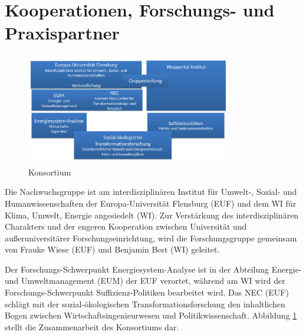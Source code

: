 \documentclass[a4paper,11pt,twoside]{scrartcl}
\begin{document}
\section{Kooperationen, Forschungs- und Praxispartner}
\label{sec:5}

\begin{figure}[!h]
    \centering
    \includegraphics[width=0.8\textwidth]{figures/Konsortium5.pdf}
    \caption{Konsortium}
    \label{fig:konsortium}
\end{figure}

Die Nachwuchsgruppe ist am interdisziplinären Institut für Umwelt-, Sozial- und Humanwissenschaften der Europa-Universität Flensburg (EUF) und dem WI für Klima, Umwelt, Energie angesiedelt (WI).
Zur Verstärkung des interdisziplinären Charakters und der engeren Kooperation zwischen Universität und außeruniversitärer Forschungseinrichtung, wird die Forschungsgruppe gemeinsam von Frauke Wiese (EUF) und Benjamin Best (WI) geleitet.

Der Forschungs-Schwerpunkt Energiesystem-Analyse ist in der Abteilung Energie- und Umweltmanagement (EUM) der EUF verortet, während am WI wird der Forschungs-Schwerpunkt Suffizienz-Politiken bearbeitet wird. Das NEC (EUF) schlägt mit der sozial-ökologischen Transformationsforschung den inhaltlichen Bogen zwischen Wirtschaftsingenieurwesen und Politikwissenschaft. Abbildung \ref{fig:konsortium} stellt die Zusammenarbeit des Konsortiums dar.

\end{document}
